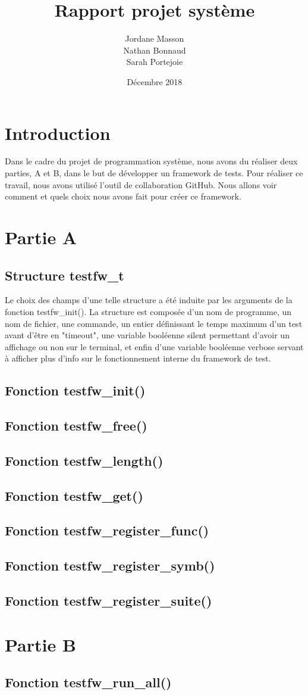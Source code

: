 \documentclass{article}
\title{Rapport projet système}
\author{Jordane Masson \\ Nathan Bonnaud \\ Sarah Portejoie}
\date{Décembre 2018}
\begin{document}
\maketitle

\section{Introduction}
Dans le cadre du projet de programmation système, nous avons du réaliser deux parties, A et B, dans le but de développer un framework de tests. Pour réaliser ce travail, nous avons utilisé l'outil de collaboration GitHub. Nous allons voir comment et quels choix nous avons fait pour  créer ce framework.
    
   
\section{Partie A}   
\subsection{Structure testfw\_t}
Le choix des champs d'une telle structure a été induite par les arguments de la fonction testfw\_init(). La structure est composée d'un nom de programme, un nom de fichier, une commande, un entier définissant le temps maximum d'un test avant d'être en "timeout", une variable booléenne silent permettant d'avoir un affichage ou non sur le terminal, et enfin d'une variable booléenne verbose servant à afficher plus d'info sur le fonctionnement interne du framework de test.
\subsection{Fonction testfw\_init()}
\subsection{Fonction testfw\_free()}
\subsection{Fonction testfw\_length()}
\subsection{Fonction testfw\_get()}
\subsection{Fonction testfw\_register\_func()}
\subsection{Fonction testfw\_register\_symb()}
\subsection{Fonction testfw\_register\_suite()}
 
\section{Partie B}
\subsection{Fonction testfw\_run\_all()}
    
\end{document}
